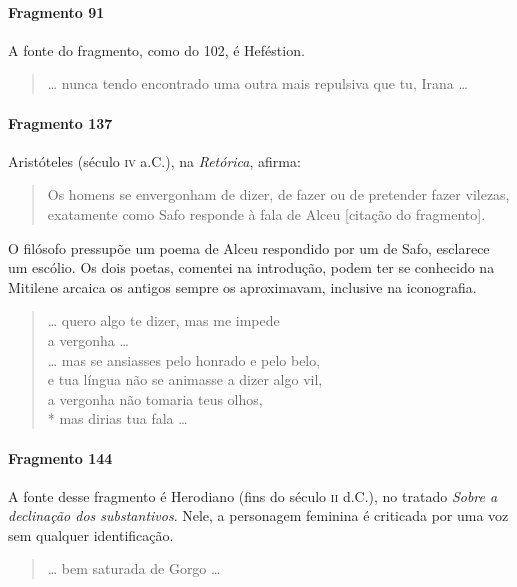 \paragraph{Fragmento 91}

{\small A fonte do fragmento, como do 102, é Heféstion.}

\begin{verse}
\ldots{} nunca tendo encontrado uma outra mais \qb{}repulsiva que tu, Irana \ldots{}
\end{verse}

\paragraph{Fragmento 137}

{\small Aristóteles (século \textsc{iv} a.C.), na \textit{Retórica}, afirma: 

\begin{quote}
Os homens se envergonham de dizer, de fazer ou de pretender fazer vilezas, exatamente
como Safo responde à fala de Alceu [citação do fragmento].
\end{quote}

O filósofo pressupõe um poema de Alceu respondido por um de Safo, esclarece um escólio. Os
dois poetas, comentei na introdução, podem ter se conhecido na Mitilene arcaica
os antigos sempre os aproximavam, inclusive na iconografia. 

\begin{verse}
\ldots{} quero algo te dizer, mas me impede\\
a vergonha \ldots{}\\
\ldots{} mas se ansiasses pelo honrado e pelo belo,\\
e tua língua não se animasse a dizer algo vil,\\
a vergonha não tomaria teus olhos,\\*
mas dirias tua fala \ldots{}
\end{verse}

\paragraph{Fragmento 144}

{\small A fonte desse fragmento é Herodiano (fins do século \textsc{ii} d.C.), no tratado
\textit{Sobre a declinação dos substantivos}. Nele, a personagem feminina é
criticada por uma voz sem qualquer identificação.}

\begin{verse}
\ldots{} bem saturada de Gorgo \ldots{}
\end{verse}

}
